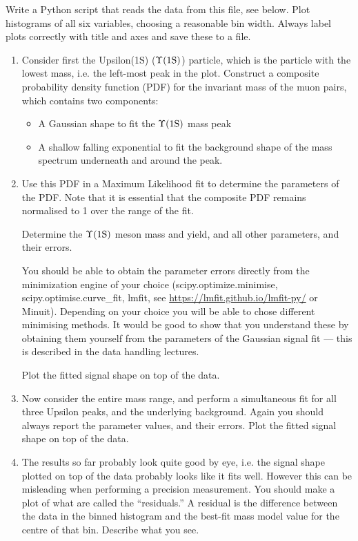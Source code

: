 Write a Python script that reads the data from this file, see below.
Plot histograms of all six variables, choosing a reasonable bin width.
Always label plots correctly with title and axes and save these to a file. 


\vspace*{-0.5cm}


\begin{enumerate}
\item Consider first the Upsilon(1S) ($\Upsilon \rm (1S)$) particle, which is the particle with the lowest mass, i.e. the left-most peak in the plot.
Construct a composite probability density function (PDF) for the invariant mass of the muon pairs, which contains two components:
\begin{itemize}
\item A Gaussian shape to fit the $\Upsilon \rm (1S)$ mass peak
\item A shallow falling exponential to fit the background shape of the mass spectrum underneath and around the peak.
\end{itemize}

\item	Use this PDF in a Maximum Likelihood fit to determine the parameters of the PDF.
Note that it is essential that the composite PDF remains normalised to 1 over the range of the fit.

Determine the $\Upsilon \rm (1S)$ meson mass and yield, and all other parameters, and their errors.

You should be able to obtain the parameter errors directly from the minimization engine of your choice (scipy.optimize.minimise, scipy.optimise.curve\_fit, lmfit, see \url{https://lmfit.github.io/lmfit-py/} or Minuit).
Depending on your choice you will be able to chose different minimising methods.
It would be good to show that you understand these by obtaining them yourself from the parameters of the Gaussian signal fit --- this is described in the data handling lectures.

Plot the fitted signal shape on top of the data.

\item Now consider the entire mass range, and perform a simultaneous fit for all three Upsilon peaks, and the underlying background.
Again you should always report the parameter values, and their errors.
Plot the fitted signal shape on top of the data.

\item The results so far probably look quite good by eye, i.e. the signal shape plotted on top of the data probably looks like it fits well.
However this can be misleading when performing a precision measurement.
You should make a plot of what are called the ``residuals.''
A residual is the difference between the data in the binned histogram and the best-fit mass model value for the centre of that bin.
Describe what you see.


\end{enumerate}
